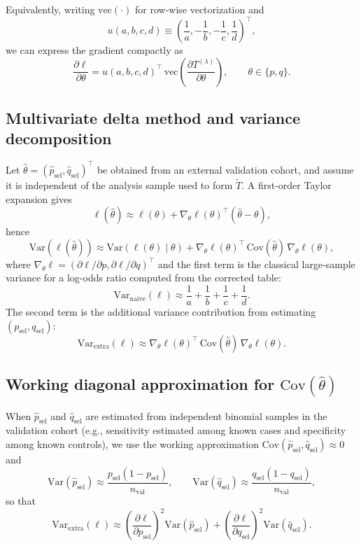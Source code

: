 \documentclass[pdflatex,sn-mathphys-num]{sn-jnl}%
\theoremstyle{thmstyleone}%
\theoremstyle{thmstyletwo}%
\theoremstyle{thmstylethree}%
\begin{document}
Equivalently, writing $\mathrm{vec}(\cdot)$ for row-wise vectorization and
\[
u(a,b,c,d)\equiv \left(\frac{1}{a},-\frac{1}{b},-\frac{1}{c},\frac{1}{d}\right)^\top,
\]
we can express the gradient compactly as
\[
\frac{\partial \ell}{\partial \theta}
=
u(a,b,c,d)^\top\,\mathrm{vec}\!\left(\frac{\partial T^{(\lambda)}}{\partial \theta}\right),
\qquad \theta\in\{p,q\}.
\]

\subsection*{Multivariate delta method and variance decomposition}

Let $\hat\theta=(\hat p_{\mathrm{sel}},\hat q_{\mathrm{sel}})^\top$ be obtained from an external validation cohort,
and assume it is independent of the analysis sample used to form $\tilde T$.
A first-order Taylor expansion gives
\[
\ell(\hat\theta)\approx \ell(\theta) + \nabla_\theta \ell(\theta)^\top(\hat\theta-\theta),
\]
hence
\[
\mathrm{Var}(\ell(\hat\theta))
\approx
\mathrm{Var}(\ell(\theta)\mid \theta)
+
\nabla_\theta \ell(\theta)^\top\,\mathrm{Cov}(\hat\theta)\,\nabla_\theta \ell(\theta),
\]
where $\nabla_\theta \ell = (\partial\ell/\partial p,\partial\ell/\partial q)^\top$ and the first term is the
classical large-sample variance for a log-odds ratio computed from the corrected table:
\[
\mathrm{Var}_{\mathrm{naive}}(\ell)\approx \frac{1}{a}+\frac{1}{b}+\frac{1}{c}+\frac{1}{d}.
\]
The second term is the additional variance contribution from estimating $(p_{\mathrm{sel}},q_{\mathrm{sel}})$:
\[
\mathrm{Var}_{\mathrm{extra}}(\ell)
\approx
\nabla_\theta \ell(\theta)^\top\,\mathrm{Cov}(\hat\theta)\,\nabla_\theta \ell(\theta).
\]

\subsection*{Working diagonal approximation for $\mathrm{Cov}(\hat\theta)$}

When $\hat p_{\mathrm{sel}}$ and $\hat q_{\mathrm{sel}}$ are estimated from independent binomial samples in the
validation cohort (e.g., sensitivity estimated among known cases and specificity among known controls),
we use the working approximation $\mathrm{Cov}(\hat p_{\mathrm{sel}},\hat q_{\mathrm{sel}})\approx 0$ and
\[
\mathrm{Var}(\hat p_{\mathrm{sel}})\approx \frac{p_{\mathrm{sel}}(1-p_{\mathrm{sel}})}{n_{\mathrm{val}}},
\qquad
\mathrm{Var}(\hat q_{\mathrm{sel}})\approx \frac{q_{\mathrm{sel}}(1-q_{\mathrm{sel}})}{n_{\mathrm{val}}},
\]
so that
\[
\mathrm{Var}_{\mathrm{extra}}(\ell)
\approx
\left(\frac{\partial \ell}{\partial p_{\mathrm{sel}}}\right)^2 \mathrm{Var}(\hat p_{\mathrm{sel}})
+
\left(\frac{\partial \ell}{\partial q_{\mathrm{sel}}}\right)^2 \mathrm{Var}(\hat q_{\mathrm{sel}}).
\]
\end{document}
